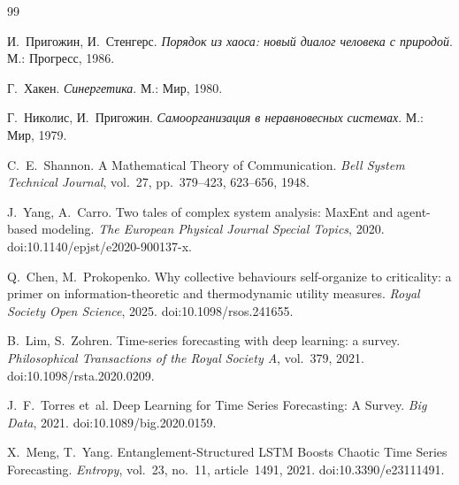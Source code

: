 \documentclass{misisarticle}
\begin{document}
\begin{thebibliography}{99}

И.~Пригожин, И.~Стенгерс.
\textit{Порядок из хаоса: новый диалог человека с природой}.
М.: Прогресс, 1986.

Г.~Хакен.
\textit{Синергетика}.
М.: Мир, 1980.

Г.~Николис, И.~Пригожин.
\textit{Самоорганизация в неравновесных системах}.
М.: Мир, 1979.

C.~E.~Shannon.
A Mathematical Theory of Communication.
\textit{Bell System Technical Journal}, vol.~27, pp.~379--423, 623--656, 1948.

J.~Yang, A.~Carro.
Two tales of complex system analysis: MaxEnt and agent-based modeling.
\textit{The European Physical Journal Special Topics}, 2020.
doi:10.1140/epjst/e2020-900137-x.

Q.~Chen, M.~Prokopenko.
Why collective behaviours self-organize to criticality: a primer on information-theoretic and thermodynamic utility measures.
\textit{Royal Society Open Science}, 2025.
doi:10.1098/rsos.241655.

B.~Lim, S.~Zohren.
Time-series forecasting with deep learning: a survey.
\textit{Philosophical Transactions of the Royal Society A}, vol.~379, 2021.
doi:10.1098/rsta.2020.0209.

J.~F.~Torres et~al.
Deep Learning for Time Series Forecasting: A Survey.
\textit{Big Data}, 2021.
doi:10.1089/big.2020.0159.

X.~Meng, T.~Yang.
Entanglement-Structured LSTM Boosts Chaotic Time Series Forecasting.
\textit{Entropy}, vol.~23, no.~11, article~1491, 2021.
doi:10.3390/e23111491.

\end{thebibliography}
\end{document}
